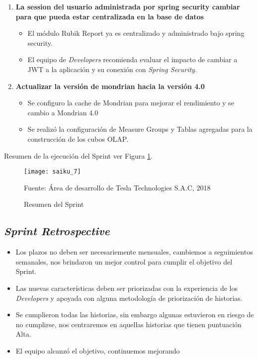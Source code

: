 \begin{spacing}{1.5}
\begin{enumerate}
			\item \textbf{La session del usuario administrada por spring security cambiar para que pueda estar centralizada en la base de datos}
				\begin{itemize}
					\item El m\'{o}dulo Rubik Report ya es centralizado y administrado bajo spring security.
					\item El equipo de \textit{Developers} recomienda evaluar el impacto de cambiar a JWT a la aplicaci\'{o}n y su conexi\'{o}n con \textit{Spring Security}.
				\end{itemize}
			
			\item \textbf{Actualizar la versi\'{o}n de mondrian hacia la versi\'{o}n 4.0}
				\begin{itemize}
					\item Se configuro la cache de Mondrian para mejorar el rendimiento y se cambio a Mondrian 4.0
					\item Se realiz\'{o} la configuraci\'{o}n de Measure Groups y Tablas agregadas para la construcci\'{o}n de los cubos OLAP.
				\end{itemize}
			
		\end{enumerate}
		Resumen de la ejecuci\'{o}n del Sprint ver Figura \ref{figure:chaperIII_10}.			
		\begin{figure}[H]
			\centering
			\texttt{[image: saiku\_7]}
			\caption {\centering \small{Resumen del Sprint}} \label{figure:chaperIII_10}
			\small {Fuente: \'{A}rea de desarrollo de Tesla Technologies S.A.C, 2018}
		\end{figure}
						
	\subsection{\textit{Sprint Retrospective}}
	\begin{itemize}
		\item Los plazos no deben ser necesariemente mensuales, cambiemos a seguimientos semanales, nos brindaron un mejor control para cumplir el objetivo del Sprint.
		\item Las nuevas caracter\'{i}sticas deben ser priorizadas con la experiencia de los \textit{Developers} y apoyada con alguna metodolog\'{i}a de priorizaci\'{o}n de historias.
		\item Se cumplieron todas las historias, sin embargo algunas estuvieron en riesgo de no cumplirse, nos centraremos en aquellas historias que tienen puntuaci\'{o}n Alta.
		\item El equipo alcanz\'{o} el objetivo, continuemos mejorando
	\end{itemize}


\end{spacing}
